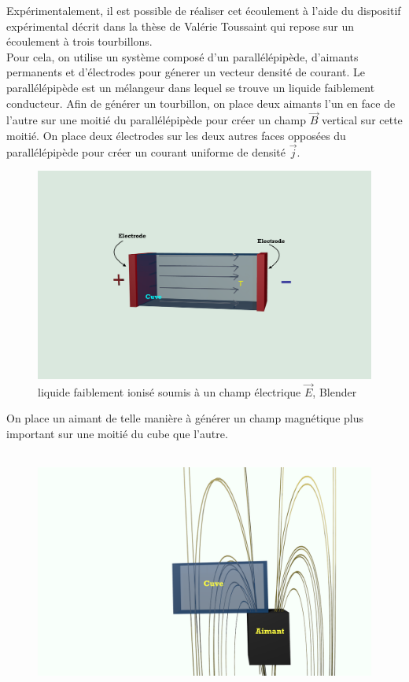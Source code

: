 \documentclass[a4paper,12pt,titlepage]{report}
\begin{document}
\begin{onehalfspace}
Expérimentalement, il est possible de réaliser cet écoulement à l'aide du dispositif expérimental décrit dans la thèse de Valérie Toussaint qui repose sur un écoulement à trois tourbillons. \\
Pour cela, on utilise un système composé d'un parallélépipède, d’aimants permanents et d’électrodes pour génerer un vecteur densité de courant. Le parallélépipède est un mélangeur dans lequel se trouve un liquide faiblement conducteur.
Afin de générer un tourbillon, on place deux aimants l’un en face de l’autre sur une moitié du parallélépipède pour créer un champ $\vec{B}$ vertical sur cette moitié. On place deux électrodes sur les deux autres faces opposées du parallélépipède pour créer un courant uniforme de densité $\vec{j}$.
\begin{figure}[!h]
	\begin{center}
	\centering	
		\includegraphics[height = 7cm, keepaspectratio]{graphes/blender_cuve_champvec.png}
		\caption{liquide faiblement ionisé soumis à un champ électrique $\vec{E}$, Blender}
	\end{center}
\end{figure}
\newline
On place un aimant de telle manière à générer un champ magnétique plus important sur une moitié du cube que l'autre.
\begin{figure}[!h]
	\begin{center}
	\centering
		\includegraphics[height = 8cm, keepaspectratio]{graphes/blender_cuve_mag2.png} 

\end{center}
\end{figure}
\end{onehalfspace}
\end{document}
